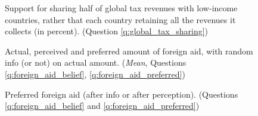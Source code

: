 \documentclass[12pt,english]{article}
\begin{document}
\begin{figure}[h!]
    \caption[Support for sharing half of global tax revenues with low-income countries]{Support for sharing half of global tax revenues with low-income countries, rather that each country retaining all the revenues it collects (in percent). (Question \ref{q:global_tax_sharing})}\label{fig:global_tax_sharing}
\end{figure}

\begin{figure} 
    \caption[Actual, perceived and preferred amount of foreign aid (mean)]{Actual, perceived and preferred amount of foreign aid, with random info (or not) on actual amount. (\textit{Mean}, Questions \ref{q:foreign_aid_belief}, \ref{q:foreign_aid_preferred})}\label{fig:foreign_aid_amount}
\end{figure}


\begin{figure} 
    \caption[Preferred foreign aid (summary)]{Preferred foreign aid (after info or after perception). (Questions \ref{q:foreign_aid_belief} and \ref{q:foreign_aid_preferred})}\label{fig:foreign_aid_no_less_all}
\end{figure} 
\end{document}
